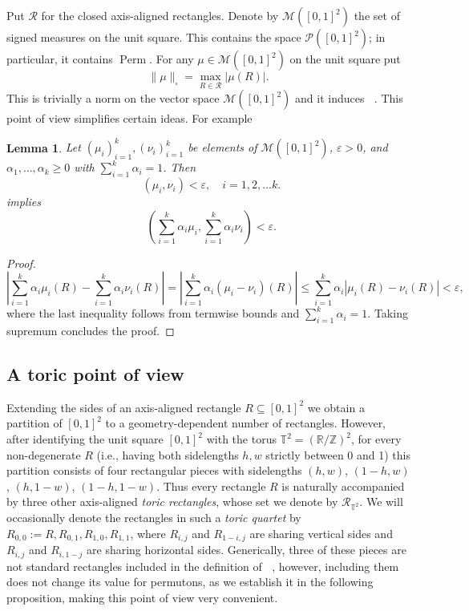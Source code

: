 \documentclass{article}
\newcommand{\Perm}{\mathop{\mathrm{Perm}}}
\newcommand{\ds}{\mathop{d_\square}}
\newtheorem{lemma}[theorem]{Lemma}
\theoremstyle{definition}
\begin{document}
Put $\mathcal{R}$ for the closed axis-aligned rectangles. Denote by $\mathcal{M}([0, 1]^2)$ the set of signed measures on the unit square. This contains the space $\mathcal{P}([0, 1]^2)$; in particular, it contains $\Perm$. For any $\mu\in\mathcal{M}([0, 1]^2)$ on the unit square put 
$$\|\mu\|_{\square}=\max_{R\in\mathcal{R}}|\mu(R)|.$$
This is trivially a norm on the vector space $\mathcal{M}([0, 1]^2)$ and it induces $\ds$. This point of view simplifies certain ideas. For example
\begin{lemma}
    Let $(\mu_i)_{i=1}^{k}, (\nu_i)_{i=1}^{k}$ be elements of $\mathcal{M}([0, 1]^2)$, $\varepsilon>0$, and $\alpha_1, \dots, \alpha_k\geq 0$ with $\sum_{i=1}^{k}\alpha_i=1$.
    Then
    $$\ds(\mu_i, \nu_i) < \varepsilon, \quad i=1, 2, \dots k.$$
    implies
    $$\ds\left(\sum_{i=1}^k\alpha_i\mu_i, \sum_{i=1}^k\alpha_i\nu_i\right)<\varepsilon.$$
\end{lemma}
\begin{proof}
    $$\left|\sum_{i=1}^k\alpha_i\mu_i(R)-\sum_{i=1}^k\alpha_i\nu_i(R)\right|=\left|\sum_{i=1}^k\alpha_i(\mu_i-\nu_i)(R)\right|\leq \sum_{i=1}^{k}\alpha_i|\mu_i(R)-\nu_i(R)|<\varepsilon,$$
    where the last inequality follows from termwise bounds and $\sum_{i=1}^{k}\alpha_i=1$. Taking supremum concludes the proof.
\end{proof}

\subsection{A toric point of view}

Extending the sides of an axis-aligned rectangle $R\subseteq[0, 1]^2$ we obtain a partition of $[0, 1]^2$ to a geometry-dependent number of rectangles. However, after identifying the unit square $[0, 1]^2$ with the torus $\mathbb{T}^2=(\mathbb{R}/\mathbb{Z})^2$, for every non-degenerate $R$ (i.e., having both sidelengths $h, w$ strictly between 0 and 1) this partition consists of four rectangular pieces with sidelengths $(h, w)$, $(1-h, w)$, $(h, 1-w)$, $(1-h, 1-w)$. Thus every rectangle $R$ is naturally accompanied by three other axis-aligned \emph{toric rectangles}, whose set we denote by $\mathcal{R}_{\mathbb{T}^2}$. We will occasionally denote the rectangles in such a \emph{toric quartet} by $R_{0, 0}:=R, R_{0, 1}, R_{1, 0}, R_{1, 1}$, where $R_{i, j}$ and $R_{1-i, j}$ are sharing vertical sides and $R_{i, j}$ and $R_{i, 1-j}$ are sharing horizontal sides. Generically, three of these pieces are not standard rectangles included in the definition of $\ds$, however, including them does not change its value for permutons, as we establish it in the following proposition, making this point of view very convenient.
\end{document}
